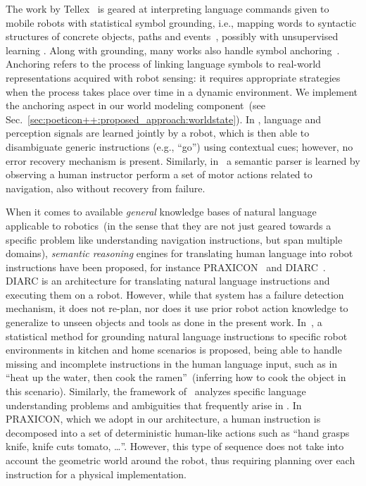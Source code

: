 The work by Tellex~\cite{tellex:2011:aaai,tellex:2011:ai} is geared at interpreting language commands given to mobile robots with statistical symbol grounding, i.e., mapping words to syntactic structures of concrete objects, paths and events~\cite{harnad:1990}, possibly with unsupervised learning \cite{taniguchi:2016:advr}.
Along with grounding, many works also handle symbol anchoring~\cite{coradeschi:2003:ras,lemaignan:2012:ijsr,elfring:2013:ras}.
Anchoring refers to the process of linking language symbols to real-world representations acquired with robot sensing: it requires appropriate strategies when the process takes place over time in a dynamic environment.
We implement the anchoring aspect in our world modeling component~(see Sec.~\ref{sec:poeticon++:proposed_approach:worldstate}).
In \cite{matuszek:2012:icml,matuszek:2013:er}, language and perception signals are learned jointly by a robot, which is then able to disambiguate generic instructions (e.g., ``go'') using contextual cues; however, no error recovery mechanism is present.
Similarly, in~\cite{chen_mooney:2011:aaai} a semantic parser is learned by observing a human instructor perform a set of motor actions related to navigation, also without recovery from failure.

When it comes to available \emph{general} knowledge bases of natural language applicable to robotics~(in the sense that they are not just geared towards a specific problem like understanding navigation instructions, but span multiple domains), \emph{semantic reasoning} engines for translating human language into robot instructions have been proposed, for instance PRAXICON~\cite{pastra:2008:praxicon,mavroeidis:2016:praxicon} and DIARC~\cite{dzifcak:2009:icra}. DIARC is an architecture for translating natural language instructions and executing them on a robot.
However, while that system has a failure detection mechanism, it does not re-plan, nor does it use prior robot action knowledge to generalize to unseen objects and tools as done in the present work.
In~\cite{misra:2016:ijrr}, a statistical method for grounding natural language instructions to specific robot environments in kitchen and home scenarios is proposed, being able to handle missing and incomplete instructions in the human language input, such as in ``heat up the water, then cook the ramen''~(inferring how to cook the object in this scenario).
Similarly, the framework of~\cite{eppe:2016:iros} analyzes specific language understanding problems and ambiguities that frequently arise in \hri.
In PRAXICON, which we adopt in our architecture, a human instruction is decomposed into a set of deterministic human-like actions such as ``hand grasps knife, knife cuts tomato, \dots''.
However, this type of sequence does not take into account the geometric world around the robot, thus requiring planning over each instruction for a physical implementation.


